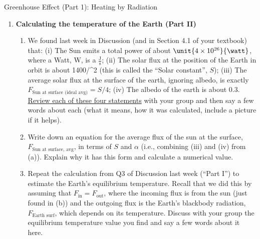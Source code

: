 \documentclass[12pt]{article}
\begin{document}
\begin{center}
{\Large Greenhouse Effect (Part 1): Heating by Radiation}
\end{center}

\begin{enumerate}

\item {\bf  Calculating the temperature of the Earth (Part II)}
	\begin{enumerate}
	\item We found last week in Discussion (and in Section 4.1 of your textbook) that: (i) The Sun emits a total power of about $\unit{4 \times 10^{26}}{\watt}$, where a Watt, W, is a $\frac{\text{J}}{\text{s}}$; (ii) The solar flux at the position of the Earth in orbit is about \unit{1400}{\watt/\meter^2} (this is called the ``Solar constant'', $S$); (iii) The average solar flux at the surface of the earth, ignoring albedo, is exactly $F_\text{Sun at surface (ideal avg)} = S / 4$; (iv) The albedo of the earth is about 0.3.  \underline{Review each of these four statements} with your group and then say a few words about each (what it means, how it was calculated, include a picture if it helps).
	\item Write down an equation for the average flux of the sun at the surface, $F_\text{Sun at surface, avg}$, in terms of $S$ and $\alpha$ (i.e., combining (iii) and (iv) from (a)).  Explain why it has this form and calculate a numerical value.
	\item Repeat the calculation from Q3 of Discussion last week (``Part I'') to estimate the Earth's equilibrium temperature.  Recall that we did this by assuming that $F_\text{in} = F_\text{out}$, where the incoming flux is from the sun (just found in (b)) and the outgoing flux is the Earth's blackbody radiation, $F_\text{Earth surf}$, which depends on its temperature. Discuss with your group the equilibrium temperature value you find and say a few words about it here.

\end{enumerate}
\end{enumerate}
\end{document}
